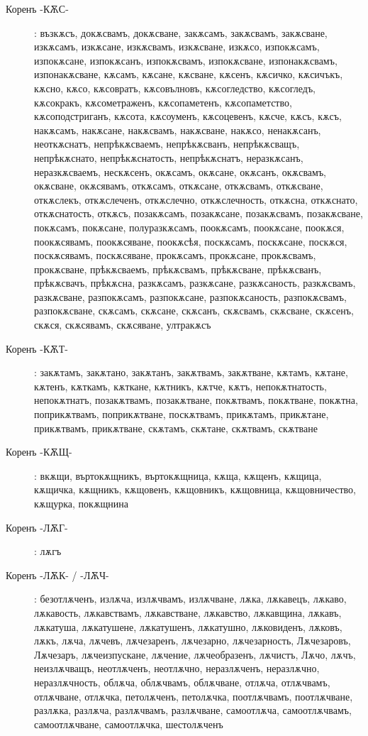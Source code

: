 \documentclass{article}
\begin{document}
\begin{description}
		\item[Коренъ -КѪС-]: възкѫсъ, докѫсвамъ, докѫсване, закѫсамъ, закѫсвамъ, закѫсване, изкѫсамъ, изкѫсане, изкѫсвамъ, изкѫсване, изкѫсо, изпокѫсамъ, изпокѫсане, изпокѫсанъ, изпокѫсвамъ, изпокѫсване, изпонакѫсвамъ, изпонакѫсване, кѫсамъ, кѫсане, кѫсване, кѫсенъ, кѫсичко, кѫсичъкъ, кѫсно, кѫсо, кѫсовратъ, кѫсовълновъ, кѫсогледство, кѫсогледъ, кѫсокракъ, кѫсометраженъ, кѫсопаметенъ, кѫсопаметство, кѫсоподстриганъ, кѫсота, кѫсоуменъ, кѫсоцевенъ, кѫсче, кѫсъ, кѫсъ, накѫсамъ, накѫсане, накѫсвамъ, накѫсване, накѫсо, ненакѫсанъ, неоткѫснатъ, непрѣкѫсваемъ, непрѣкѫсванъ, непрѣкѫсващъ, непрѣкѫснато, непрѣкѫснатость, непрѣкѫснатъ, неразкѫсанъ, неразкѫсваемъ, нескѫсенъ, окѫсамъ, окѫсане, окѫсанъ, окѫсвамъ, окѫсване, окѫсявамъ, откѫсамъ, откѫсане, откѫсвамъ, откѫсване, откѫслекъ, откѫслеченъ, откѫслечно, откѫслечность, откѫсна, откѫснато, откѫснатость, откѫсъ, позакѫсамъ, позакѫсане, позакѫсвамъ, позакѫсване, покѫсамъ, покѫсане, полуразкѫсамъ, поокѫсамъ, поокѫсане, поокѫся, поокѫсявамъ, поокѫсяване, поокѫсѣя, поскѫсамъ, поскѫсане, поскѫся, поскѫсявамъ, поскѫсяване, прокѫсамъ, прокѫсане, прокѫсвамъ, прокѫсване, прѣкѫсваемъ, прѣкѫсвамъ, прѣкѫсване, прѣкѫсванъ, прѣкѫсвачъ, прѣкѫсна, разкѫсамъ, разкѫсане, разкѫсаность, разкѫсвамъ, разкѫсване, разпокѫсамъ, разпокѫсане, разпокѫсаность, разпокѫсвамъ, разпокѫсване, скѫсамъ, скѫсане, скѫсанъ, скѫсвамъ, скѫсване, скѫсенъ, скѫся, скѫсявамъ, скѫсяване, ултракѫсъ
		
		\item[Коренъ -КѪТ-]: закѫтамъ, закѫтано, закѫтанъ, закѫтвамъ, закѫтване, кѫтамъ, кѫтане, кѫтенъ, кѫткамъ, кѫткане, кѫтникъ, кѫтче, кѫтъ, непокѫтнатость, непокѫтнатъ, позакѫтвамъ, позакѫтване, покѫтвамъ, покѫтване, покѫтна, поприкѫтвамъ, поприкѫтване, поскѫтвамъ, прикѫтамъ, прикѫтане, прикѫтвамъ, прикѫтване, скѫтамъ, скѫтане, скѫтвамъ, скѫтване
		
		\item[Коренъ -КѪЩ-]: вкѫщи, въртокѫщникъ, въртокѫщница, кѫща, кѫщенъ, кѫщица, кѫщичка, кѫщникъ, кѫщовенъ, кѫщовникъ, кѫщовница, кѫщовничество, кѫщурка, покѫщнина
		
		\item[Коренъ -ЛѪГ-]: лѫгъ
		
		\item[Коренъ -ЛѪК- / -ЛѪЧ-]: безотлѫченъ, излѫча, излѫчвамъ, излѫчване, лѫка, лѫкавецъ, лѫкаво, лѫкавость, лѫкавствамъ, лѫкавстване, лѫкавство, лѫкавщина, лѫкавъ, лѫкатуша, лѫкатушене, лѫкатушенъ, лѫкатушно, лѫковиденъ, лѫковъ, лѫкъ, лѫча, лѫчевъ, лѫчезаренъ, лѫчезарно, лѫчезарность, Лѫчезаровъ, Лѫчезаръ, лѫчеизпускане, лѫчение, лѫчеобразенъ, лѫчистъ, Лѫчо, лѫчъ, неизлѫчващъ, неотлѫченъ, неотлѫчно, неразлѫченъ, неразлѫчно, неразлѫчность, облѫча, облѫчвамъ, облѫчване, отлѫча, отлѫчвамъ, отлѫчване, отлѫчка, петолѫченъ, петолѫчка, поотлѫчвамъ, поотлѫчване, разлѫка, разлѫча, разлѫчвамъ, разлѫчване, самоотлѫча, самоотлѫчвамъ, самоотлѫчване, самоотлѫчка, шестолѫченъ
		

\end{description}
\end{document}

